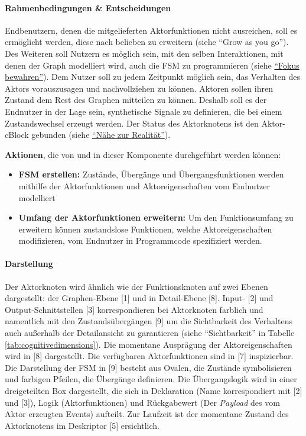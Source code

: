 \paragraph{Rahmenbedingungen \& Entscheidungen} Endbenutzern, denen die mitgelieferten Aktorfunktionen nicht ausreichen, soll es ermöglicht werden, diese nach belieben zu erweitern (siehe "`Grow as you go"'). Des Weiteren soll Nutzern es möglich sein, mit den selben Interaktionen, mit denen der Graph modelliert wird, auch die \ac{FSM} zu programmieren (siehe \hyperref[par:fokusbewahren]{"`Fokus bewahren"'}). Dem Nutzer soll zu jedem Zeitpunkt möglich sein, das Verhalten des Aktors vorauszusagen und nachvollziehen zu können. Aktoren sollen ihren Zustand dem Rest des Graphen mitteilen zu können. Deshalb soll es der Endnutzer in der Lage sein, synthetische Signale zu definieren, die bei einem Zustandswechsel erzeugt werden. Der Status des Aktorknotens ist den Aktor-cBlock gebunden (siehe \hyperref[par:naehezurrealitaet]{"`Nähe zur Realität"'}). 

\textbf{Aktionen}, die von und in dieser Komponente durchgeführt werden können: 
\begin{itemize}
    \item \textbf{\ac{FSM} erstellen:} Zustände, Übergänge und Übergangsfunktionen werden mithilfe der Aktorfunktionen und Aktoreigenschaften vom Endnutzer modelliert
    \item \textbf{Umfang der Aktorfunktionen erweitern:} Um den Funktionsumfang zu erweitern können zustandslose Funktionen, welche Aktoreigenschaften modifizieren, vom Endnutzer in Programmcode spezifiziert werden.
\end{itemize}

\paragraph{Darstellung} Der Aktorknoten wird ähnlich wie der Funktionsknoten auf zwei Ebenen dargestellt: der Graphen-Ebene [1] und in Detail-Ebene [8]. Input- [2] und Output-Schnittstellen [3] korrespondieren bei Aktorknoten farblich und namentlich mit den Zustandsübergängen [9] um die Sichtbarkeit des Verhaltens auch außerhalb der Detailansicht zu garantieren (siehe "`Sichtbarkeit"' in Tabelle \ref{tab:cognitivedimensions}). Die momentane Ausprägung der Aktoreigenschaften wird in [8] dargestellt. Die verfügbaren Aktorfunktionen sind in [7] inspizierbar. Die Darstellung der \ac{FSM} in [9] besteht aus Ovalen, die Zustände symbolisieren und farbigen Pfeilen, die Übergänge definieren. Die Übergangslogik wird in einer dreigeteilten Box dargestellt, die sich in Deklaration (Name korrespondiert mit [2] und [3]), Logik (Aktorfunktionen) und Rückgabewert (Der \textit{Payload} des vom Aktor erzeugten Events) aufteilt. Zur Laufzeit ist der momentane Zustand des Aktorknotens im Deskriptor [5] ersichtlich.

